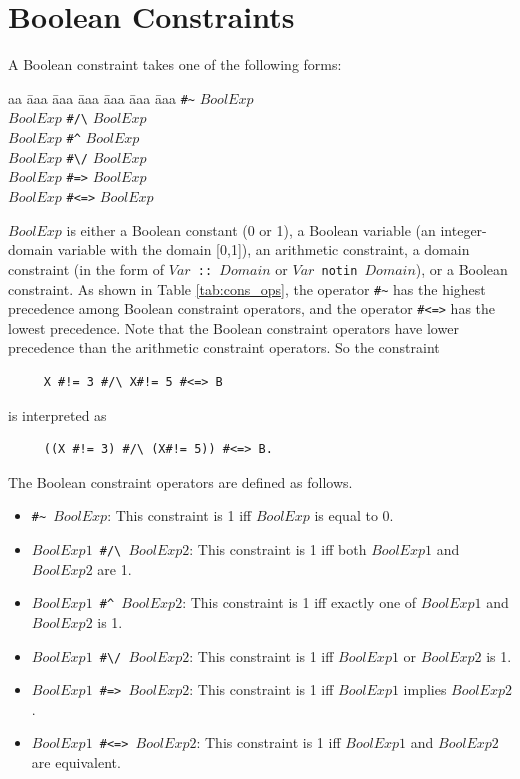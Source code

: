 \section{Boolean Constraints}
A Boolean constraint takes one of the following forms:
\begin{tabbing}
aa \= aaa \= aaa \= aaa \= aaa \= aaa \= aaa \kill
\> \verb+#~+ $BoolExp$ \\
\>   $BoolExp$ \verb+#/\+ $BoolExp$ \\
\>   $BoolExp$ \verb+#^+ $BoolExp$ \\
\>   $BoolExp$ \verb+#\/+ $BoolExp$ \\
\>   $BoolExp$ \verb+#=>+ $BoolExp$ \\
\>   $BoolExp$ \verb+#<=>+ $BoolExp$ \\
\end{tabbing}
$BoolExp$ is either a Boolean constant (0 or 1), a Boolean variable (an integer-domain variable with the domain [0,1]), an arithmetic constraint, a domain constraint (in the form of \texttt{$Var$ :: $Domain$} or \texttt{$Var$ notin $Domain$}), or a Boolean constraint. As shown in Table \ref{tab:cons_ops}, the operator \verb+#~+ has the highest precedence among Boolean constraint operators, and the operator \verb+#<=>+ has the lowest precedence. Note that the Boolean constraint operators have lower precedence than the arithmetic constraint operators. So the constraint 
\begin{verbatim}
     X #!= 3 #/\ X#!= 5 #<=> B
\end{verbatim}
is interpreted as
\begin{verbatim}
     ((X #!= 3) #/\ (X#!= 5)) #<=> B.
\end{verbatim}
The Boolean constraint operators are defined as follows.
\begin{itemize}
\item {\tt \verb+#~+ $BoolExp$}: This constraint is 1 iff $BoolExp$ is equal to 0.
\item {\tt $BoolExp1$ \verb+#/\+ $BoolExp2$}: This constraint is 1 iff both $BoolExp1$ and $BoolExp2$ are 1.
\item {\tt $BoolExp1$ \verb+#^+ $BoolExp2$}:  This constraint is 1 iff exactly one of $BoolExp1$ and \newline $BoolExp2$ is 1.
\item {\tt $BoolExp1$ \verb+#\/+ $BoolExp2$}:  This constraint is 1 iff $BoolExp1$ or $BoolExp2$ is 1.
\item {\tt $BoolExp1$ \verb+#=>+ $BoolExp2$}: This constraint is 1 iff $BoolExp1$ implies $BoolExp2$.
\item {\tt $BoolExp1$ \verb+#<=>+ $BoolExp2$}: This constraint is 1 iff $BoolExp1$ and $BoolExp2$ are equivalent.
\end{itemize}

